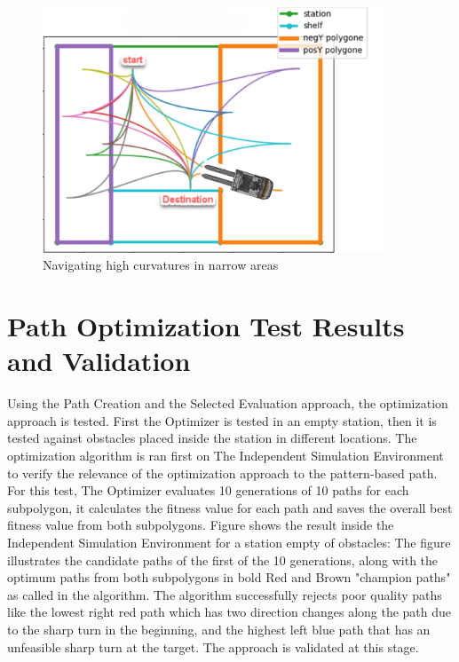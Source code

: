 \begin{figure}[H]
    \begin{center}
        \includegraphics[width=4in]{images/Chap2/curv_problem.png} %
        \caption{Navigating high curvatures in narrow areas}
        \label{curv_problem}
        \end{center}    
\end{figure}

\section{Path Optimization Test Results and Validation}

Using the Path Creation and the Selected Evaluation approach, the optimization approach is tested.
First the Optimizer is tested in an empty station, then it is tested against obstacles placed inside the station 
in different locations. 
The optimization algorithm is ran first on The 
Independent Simulation Environment to verify the relevance of the optimization approach to the pattern-based 
path. 
For this test, The Optimizer evaluates 10 generations of 10 paths for each subpolygon, it calculates the fitness value 
for each path and saves the overall best fitness value from both subpolygons. 
Figure  shows the result inside the Independent Simulation Environment for a station empty of obstacles:
The figure illustrates the candidate paths of the first of the 10 generations, along with the optimum paths from 
both subpolygons in bold Red and Brown "champion paths" as called in the algorithm. 
The algorithm successfully rejects poor quality paths like the lowest right red path which has two direction changes 
along the path due to the sharp turn in the beginning, and the highest left blue path that 
has an unfeasible sharp turn at the target.
The approach is validated at this stage. 

